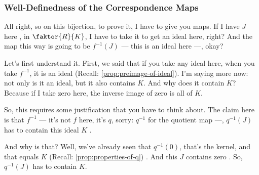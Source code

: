 \begin{hidden}
\end{hidden}

\begin{proofWrapper}
\subsubsection{Well-Definedness of the Correspondence Maps}

\begin{speech}[00:20:07 - 00:22:05]
All right, so on this bijection, to prove it, I have to give you maps. If I have $J$ here , in $\faktor{R}{K}$, I have to take it to get an ideal here, right?  And the map this way is going to be $f^{-1}(J)$ --- this is an ideal here  ---, okay?

Let's first understand it. First, we said that if you take any ideal here, when you take $f^{-1}$, it is an ideal (Recall: \cref{prop:preimage-of-ideal}). I'm saying more now: not only is it an ideal, but it also contains $K$. And why does it contain $K$? Because if I take zero here, the inverse image of zero is all of $K$.

So, this requires some justification that you have to think about. The claim here is that $f^{-1}$ --- it's not $f$ here, it's $q$, sorry:  $q^{-1}$ for the quotient map ---, $q^{-1}(J)$ has to contain this ideal $K$ .

And why is that? Well, we've already seen that $q^{-1}(0)$, that's the kernel, and that equals $K$ (Recall: \cref{prop:properties-of-q}) . And this $J$ contains zero . So, $q^{-1}(J)$ has to contain $K$.


\end{speech}
\end{proofWrapper}
